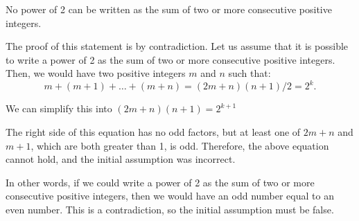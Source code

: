 \begin{solution}
No power of 2 can be written as the sum of two or more consecutive positive integers.

The proof of this statement is by contradiction. Let us assume that it is possible to write a power of 2 as the sum of two or more consecutive positive integers. Then, we would have two positive integers $m$ and $n$ such that: $$m+(m+1)+\ldots+(m+n)=(2m+n)(n+1)/2=2^k.$$ 

We can simplify this into
$(2m+n)(n+1)=2^{k+1}$


The right side of this equation has no odd factors, but at least one of $2m+n$ and $m+1$, which are both greater than 1, is odd. Therefore, the above equation cannot hold, and the initial assumption was incorrect.

In other words, if we could write a power of 2 as the sum of two or more consecutive positive integers, then we would have an odd number equal to an even number. This is a contradiction, so the initial assumption must be false.
\end{solution}